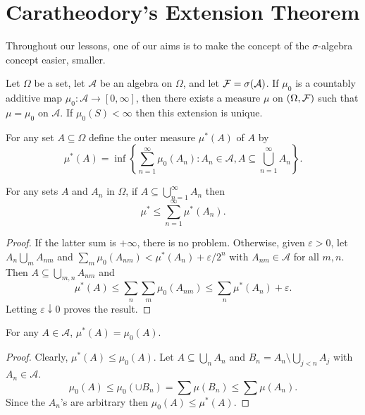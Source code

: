 \chapter{Caratheodory's Extension Theorem}

Throughout our lessons, one of our aims is to make the concept of the $\sigma$-algebra concept easier, smaller.

\begin{theorem}
Let $\Omega$ be a set, let $\mathcal A$ be an algebra on $\Omega$, and let $\mathcal F=\sigma(\mathcal{A})$. If $\mu_0$ is a countably additive map $\mu_0:\mathcal A\to [0, \infty]$, then there exists a measure $\mu$ on $(\Omega, \mathcal F)$ such that $\mu=\mu_0$ on $\mathcal A$. If $\mu_0(S)<\infty$ then this extension is unique.
\end{theorem}

\begin{definition}
For any set $A\subseteq \Omega$ define the outer measure $\mu^*(A)$ of $A$ by
\begin{equation}
\mu^*(A)=\inf\left\{\sum_{n=1}^{\infty}\mu_0(A_n): A_n\in \mathcal{A}, A\subseteq \bigcup_{n=1}^\infty A_n \right\}.
\end{equation}
\end{definition}

\begin{lemma}
For any sets $A$ and $A_n$ in $\Omega$, if $A\subseteq \bigcup_{n=1}^\infty A_n$ then
\begin{equation}
\mu^*\leq\sum_{n=1}^{\infty} \mu^*(A_n).
\end{equation}
\end{lemma}

\begin{proof}
If the latter sum is $+\infty$, there is no problem. Otherwise, given $\varepsilon>0$, let $A_n\bigcup_m A_{nm}$ and $\sum_{m}\mu_0(A_{nm})<\mu^*(A_n)+\varepsilon/2^n$ with $A_{nm}\in\mathcal A$ for all $m,n$. Then $A\subseteq \bigcup_{m,n}A_{nm}$ and
\begin{equation}
\mu^*(A)\leq \sum_n\sum_m\mu_0(A_{nm})\leq \sum_n \mu^*(A_n)+\varepsilon.
\end{equation}
Letting $\varepsilon \downarrow 0$ proves the result.
\end{proof}

\begin{lemma}
For any $A\in \mathcal A$, $\mu^*(A)=\mu_0(A)$.
\end{lemma}

\begin{proof}
Clearly, $\mu^*(A)\leq \mu_0(A)$. Let $A\subseteq\bigcup_n A_n$ and $B_n=A_n\setminus\bigcup_{j<n}A_j$ with $A_n\in\mathcal A$. \begin{equation}
\mu_0(A)\leq\mu_0(\cup B_n)=\sum \mu(B_n)\leq \sum \mu(A_n).
\end{equation}
Since the $A_n$'s are arbitrary then $\mu_0(A)\leq \mu^*(A)$.
\end{proof}

